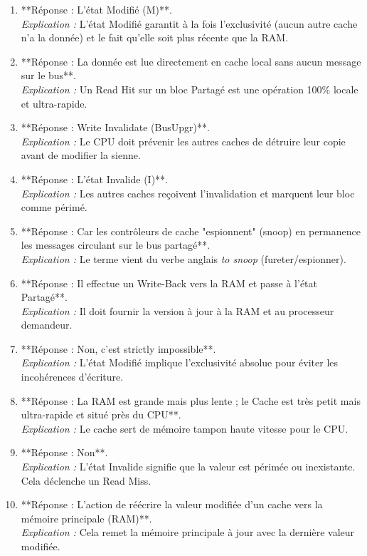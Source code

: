 \documentclass[12pt,a4paper]{article}
\begin{document}
\begin{enumerate}[label=\textbf{Q\arabic*:}]
    \item **Réponse : L'état Modifié (M)**.\\
    \textit{Explication :} L'état Modifié garantit à la fois l'exclusivité (aucun autre cache n'a la donnée) et le fait qu'elle soit plus récente que la RAM.

    \item **Réponse : La donnée est lue directement en cache local sans aucun message sur le bus**.\\
    \textit{Explication :} Un Read Hit sur un bloc Partagé est une opération 100\% locale et ultra-rapide.

    \item **Réponse : Write Invalidate (BusUpgr)**.\\
    \textit{Explication :} Le CPU doit prévenir les autres caches de détruire leur copie avant de modifier la sienne.

    \item **Réponse : L'état Invalide (I)**.\\
    \textit{Explication :} Les autres caches reçoivent l'invalidation et marquent leur bloc comme périmé.

    \item **Réponse : Car les contrôleurs de cache "espionnent" (snoop) en permanence les messages circulant sur le bus partagé**.\\
    \textit{Explication :} Le terme vient du verbe anglais \textit{to snoop} (fureter/espionner).

    \item **Réponse : Il effectue un Write-Back vers la RAM et passe à l'état Partagé**.\\
    \textit{Explication :} Il doit fournir la version à jour à la RAM et au processeur demandeur.

    \item **Réponse : Non, c'est strictly impossible**.\\
    \textit{Explication :} L'état Modifié implique l'exclusivité absolue pour éviter les incohérences d'écriture.

    \item **Réponse : La RAM est grande mais plus lente ; le Cache est très petit mais ultra-rapide et situé près du CPU**.\\
    \textit{Explication :} Le cache sert de mémoire tampon haute vitesse pour le CPU.

    \item **Réponse : Non**.\\
    \textit{Explication :} L'état Invalide signifie que la valeur est périmée ou inexistante. Cela déclenche un Read Miss.

    \item **Réponse : L'action de réécrire la valeur modifiée d'un cache vers la mémoire principale (RAM)**.\\
    \textit{Explication :} Cela remet la mémoire principale à jour avec la dernière valeur modifiée.
\end{enumerate}
\end{document}
